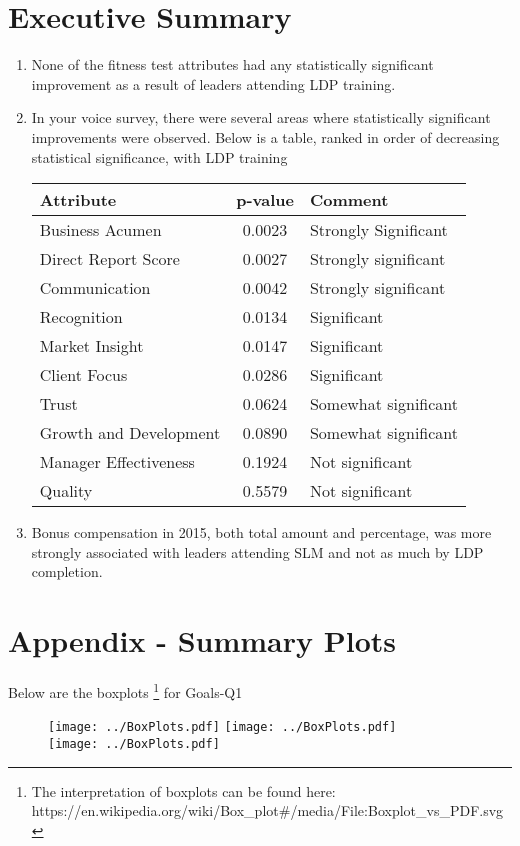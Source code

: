 \documentclass[11pt]{extarticle} %
\begin{document}
\section{Executive Summary}
\begin{enumerate}
\item None of the fitness test attributes had any statistically significant improvement as a result of leaders attending LDP training. \\
\item In your voice survey, there were several areas where statistically significant improvements were observed. Below is a table, ranked in order of decreasing statistical significance, with LDP training
\begin{table}[H]
\centering
\begin{tabular}{l|c|l}
\hline
\hline
Attribute & p-value & Comment \\
\hline
Business Acumen 	& 0.0023 & Strongly Significant \\
Direct Report Score 	& 0.0027 & Strongly significant \\
Communication 		& 0.0042 & Strongly significant \\
Recognition 		& 0.0134 & Significant \\
Market Insight 		& 0.0147 & Significant \\
Client Focus 		& 0.0286 & Significant \\
Trust 			& 0.0624 & Somewhat significant \\
Growth and Development 	& 0.0890 & Somewhat significant \\
Manager Effectiveness 	& 0.1924 & Not significant \\
Quality 		& 0.5579 & Not significant \\
\hline
\hline
\end{tabular}
\end{table}

\item Bonus compensation in 2015, both total amount and percentage, was more strongly associated with leaders attending SLM and not as much by LDP completion.

\end{enumerate}


\newpage
\section{Appendix - Summary Plots}
Below are the boxplots {\footnote{The interpretation of boxplots can be found here: https://en.wikipedia.org/wiki/Box\_plot\#/media/File:Boxplot\_vs\_PDF.svg}} for Goals-Q1
\begin{figure}[H]
\centering 
\texttt{[image: ../BoxPlots.pdf]}
\texttt{[image: ../BoxPlots.pdf]} \\
\texttt{[image: ../BoxPlots.pdf]}
\end{figure}
\end{document}
